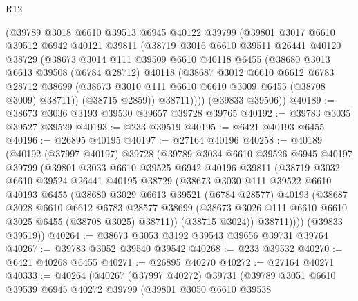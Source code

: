 \begin{lexlean}{R12}
\begin{coremodule}
      (@39789
        @3018
        @6610
        @39513
        @6945
        @40122
        @39799
        (@39801
          @3017
          @6610
          @39512
          @6942
          @40121
          @39811
          (@38719
            @3016
            @6610
            @39511
            @26441
            @40120
            @38729
            (@38673
              @3014
              @111
              @39509
              @6610
              @40118
              @6455
              (@38680
                @3013
                @6613
                @39508
                (@6784 @28712)
                @40118
                (@38687
                  @3012
                  @6610
                  @6612
                  @6783
                  @28712
                  @38699
                  (@38673 @3010 @111 @6610 @6610 @3009 @6455 (@38708 @3009) @38711))
                (@38715 @2859))
              @38711))))
      (@39833 @39506))
@40189 := @38673 @3036 @3193 @39530 @39657 @39728 @39765
@40192 := @39783 @3035 @39527 @39529
@40193 := @233 @39519
@40195 := @6421 @40193 @6455
@40196 := @26895 @40195
@40197 := @27164 @40196
@40258 := @40189
    (@40192
      (@37997 @40197)
      @39728
      (@39789
        @3034
        @6610
        @39526
        @6945
        @40197
        @39799
        (@39801
          @3033
          @6610
          @39525
          @6942
          @40196
          @39811
          (@38719
            @3032
            @6610
            @39524
            @26441
            @40195
            @38729
            (@38673
              @3030
              @111
              @39522
              @6610
              @40193
              @6455
              (@38680
                @3029
                @6613
                @39521
                (@6784 @28577)
                @40193
                (@38687
                  @3028
                  @6610
                  @6612
                  @6783
                  @28577
                  @38699
                  (@38673 @3026 @111 @6610 @6610 @3025 @6455 (@38708 @3025) @38711))
                (@38715 @3024))
              @38711))))
      (@39833 @39519))
@40264 := @38673 @3053 @3192 @39543 @39656 @39731 @39764
@40267 := @39783 @3052 @39540 @39542
@40268 := @233 @39532
@40270 := @6421 @40268 @6455
@40271 := @26895 @40270
@40272 := @27164 @40271
@40333 := @40264
    (@40267
      (@37997 @40272)
      @39731
      (@39789
        @3051
        @6610
        @39539
        @6945
        @40272
        @39799
        (@39801
          @3050
          @6610
          @39538

\end{coremodule}
\end{lexlean}
